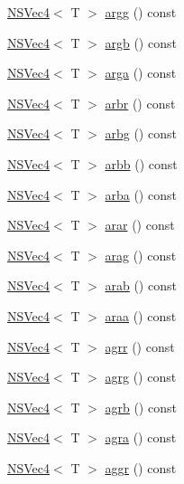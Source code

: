 \begin{DoxyCompactItemize}
\item 
\hyperlink{structNSVec4}{N\-S\-Vec4}$<$ T $>$ \hyperlink{structNSVec4_ae041ab66c076f81e3c6354dd28165547}{argg} () const 
\item 
\hyperlink{structNSVec4}{N\-S\-Vec4}$<$ T $>$ \hyperlink{structNSVec4_a260593f9696f20d7519fe2798bed0d83}{argb} () const 
\item 
\hyperlink{structNSVec4}{N\-S\-Vec4}$<$ T $>$ \hyperlink{structNSVec4_a516e979dce70b74a9f722b3faa490939}{arga} () const 
\item 
\hyperlink{structNSVec4}{N\-S\-Vec4}$<$ T $>$ \hyperlink{structNSVec4_ab2c243b335f4c10e23af7dca455f0d1d}{arbr} () const 
\item 
\hyperlink{structNSVec4}{N\-S\-Vec4}$<$ T $>$ \hyperlink{structNSVec4_a9b1f4be3b80b22286561ea6467584827}{arbg} () const 
\item 
\hyperlink{structNSVec4}{N\-S\-Vec4}$<$ T $>$ \hyperlink{structNSVec4_a65011658b76bd89c95213cc478e40b1e}{arbb} () const 
\item 
\hyperlink{structNSVec4}{N\-S\-Vec4}$<$ T $>$ \hyperlink{structNSVec4_a3c3392dc2556815f3efe20273e5b8b51}{arba} () const 
\item 
\hyperlink{structNSVec4}{N\-S\-Vec4}$<$ T $>$ \hyperlink{structNSVec4_a09a7ad73c5c3850b47f00a5f32c525ee}{arar} () const 
\item 
\hyperlink{structNSVec4}{N\-S\-Vec4}$<$ T $>$ \hyperlink{structNSVec4_a2cdf1636b52f1bb15a7b22ecb2750e89}{arag} () const 
\item 
\hyperlink{structNSVec4}{N\-S\-Vec4}$<$ T $>$ \hyperlink{structNSVec4_a8ed98baca70d2e1a17aada13736120b4}{arab} () const 
\item 
\hyperlink{structNSVec4}{N\-S\-Vec4}$<$ T $>$ \hyperlink{structNSVec4_a2e0d93e74e0afb9448ce8921c293cc93}{araa} () const 
\item 
\hyperlink{structNSVec4}{N\-S\-Vec4}$<$ T $>$ \hyperlink{structNSVec4_a45da47d3e5f4f91e082a4a9b35bdbe31}{agrr} () const 
\item 
\hyperlink{structNSVec4}{N\-S\-Vec4}$<$ T $>$ \hyperlink{structNSVec4_a3da940d167d14fdc998f9519f992d7b0}{agrg} () const 
\item 
\hyperlink{structNSVec4}{N\-S\-Vec4}$<$ T $>$ \hyperlink{structNSVec4_a901fee4a0d0eb2355524d8302d26b3ee}{agrb} () const 
\item 
\hyperlink{structNSVec4}{N\-S\-Vec4}$<$ T $>$ \hyperlink{structNSVec4_a4d72fb606d909dabb777f9fceda10175}{agra} () const 
\item 
\hyperlink{structNSVec4}{N\-S\-Vec4}$<$ T $>$ \hyperlink{structNSVec4_aab1f838b107b53e5ed1e1dc36668d750}{aggr} () const 

\end{DoxyCompactItemize}
